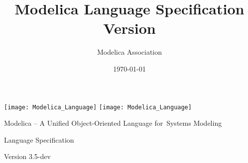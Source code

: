 \documentclass[10pt,a4paper]{report}
\title{Modelica\textsuperscript{\textregistered} Language Specification Version \mlsversion}
\date{\today}
\author{Modelica Association}
\newcommand{\mlsversion}{3.5-dev}
\begin{document}
\hypersetup{pageanchor=false,bookmarksdepth=2,destlabel=true,bookmarksopenlevel=0}

\begin{titlepage}
\addtolength{\parskip}{\baselineskip}%
\vspace*{\fill}
\begin{center}
\ifpdf
\texttt{[image: Modelica\_Language]}
\else
\texttt{[image: Modelica\_Language]}
\fi
\vspace{1cm}

\huge
Modelica\textsuperscript{\textregistered} -- A Unified Object-Oriented Language for~Systems Modeling

Language Specification

Version \mlsversion

\vspace{1cm}%

\Large
\makeatletter
\@date

\@author
\makeatother
\end{center}

\ifpdf
\vfill
\else
\newpage %
\fi

\end{titlepage}

%
\cleardoublepage
\pagestyle{fancy}
\renewcommand{\headrulewidth}{0.0pt}
\end{document}
